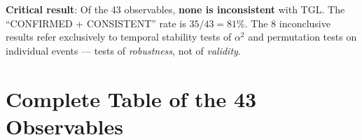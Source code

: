 \documentclass[12pt,a4paper,twoside]{article}
\newcommand{\alphaii}{\alpha^{2}}
\begin{document}
\noindent\textbf{Critical result}: Of the 43 observables, \textbf{none is inconsistent} with TGL. The ``CONFIRMED + CONSISTENT'' rate is $35/43 = 81\%$. The 8 inconclusive results refer exclusively to temporal stability tests of $\alphaii$ and permutation tests on individual events --- tests of \textit{robustness}, not of \textit{validity}.




\section{Complete Table of the 43 Observables}
\end{document}
